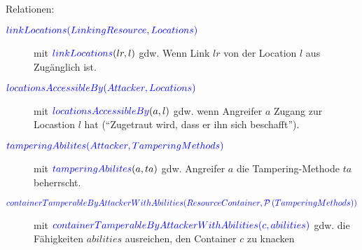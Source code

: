 \documentclass[varwidth=18cm]{standalone}
\begin{document}
Relationen:
\begin{description}
  \item[${\color{blue}{linkLocations(LinkingResource, Locations)}}$]
        mit ${\color{blue}{linkLocations}}(lr, l)$ gdw. Wenn Link $lr$
        von der Location $l$ aus Zugänglich ist.

  \item[${\color{blue}{locationsAccessibleBy(Attacker, Locations)}}$]
        mit ${\color{blue}{locationsAccessibleBy}}(a, l)$ gdw. wenn Angreifer $a$
        Zugang zur Locastion $l$ hat (\enquote{Zugetraut wird, dass er ihn sich beschafft}).

  \item[${\color{blue}{tamperingAbilites(Attacker, TamperingMethods)}}$]
        mit ${\color{blue}{tamperingAbilites}}(a, ta)$ gdw. Angreifer $a$ die
        Tampering-Methode $ta$ beherrscht.

  \item[${\color{blue}{containerTamperableByAttackerWithAbilities(ResourceContainer,
        \mathcal{P}\left(TamperingMethods\right))}}$]
        mit ${\color{blue}{containerTamperableByAttackerWithAbilities(c, abilities)}}$ gdw. die Fähigkeiten $abilities$ ausreichen, den Container $c$ zu knacken
\end{description}
\end{document}
